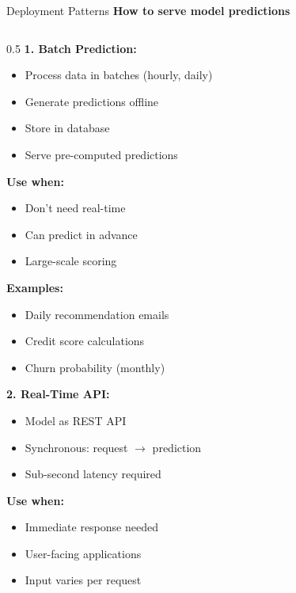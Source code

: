 \begin{frame}{Deployment Patterns}
\textbf{How to serve model predictions}

\begin{columns}
\begin{column}{0.5\textwidth}
\textbf{1. Batch Prediction:}

\begin{itemize}
\item Process data in batches (hourly, daily)
\item Generate predictions offline
\item Store in database
\item Serve pre-computed predictions
\end{itemize}

\textbf{Use when:}
\begin{itemize}
\item[$\checkmark$] Don't need real-time
\item[$\checkmark$] Can predict in advance
\item[$\checkmark$] Large-scale scoring
\end{itemize}

\textbf{Examples:}
\begin{itemize}
\item Daily recommendation emails
\item Credit score calculations
\item Churn probability (monthly)
\end{itemize}

\vspace{0.3cm}

\textbf{2. Real-Time API:}

\begin{itemize}
\item Model as REST API
\item Synchronous: request $\to$ prediction
\item Sub-second latency required
\end{itemize}

\textbf{Use when:}
\begin{itemize}
\item[$\checkmark$] Immediate response needed
\item[$\checkmark$] User-facing applications
\item[$\checkmark$] Input varies per request
\end{itemize}
\end{column}


\end{columns}
\end{frame}
